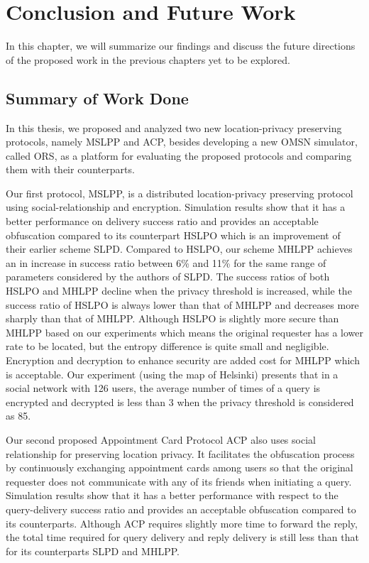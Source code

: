 


\chapter{ Conclusion and Future Work}
\label{CFW}
 

\noindent In this chapter, we will summarize our findings and discuss the future directions of the proposed work in the previous chapters yet to be explored. 


\section{ Summary of Work Done}

\noindent In this thesis, we proposed and analyzed two new location-privacy preserving protocols, namely MSLPP and ACP, besides developing a new OMSN simulator, called ORS, as a platform for evaluating the proposed protocols and comparing them with their counterparts.

Our first protocol, MSLPP, is a distributed location-privacy preserving protocol using social-relationship and encryption. Simulation results show that it has a better performance on delivery success ratio and provides an acceptable obfuscation compared to its counterpart HSLPO which is an improvement of their earlier scheme SLPD. Compared to HSLPO, our scheme MHLPP achieves an in increase in success ratio between 6\% and 11\% for the same range of parameters considered by the authors of SLPD. The success ratios of both HSLPO and MHLPP decline when the privacy threshold is increased, while the success ratio of HSLPO is always lower than that of MHLPP and decreases more sharply than that of MHLPP. Although HSLPO is slightly more secure than MHLPP based on our experiments which means the original requester has a lower rate to be located, but the entropy difference is quite small and negligible. Encryption and decryption to enhance security are added cost for MHLPP which is acceptable. Our experiment (using the map of Helsinki) presents that in a social network with 126 users, the average number of times of a query is encrypted and decrypted is less than 3 when the privacy threshold is considered as 85.

Our second proposed Appointment Card Protocol ACP also uses social relationship for preserving location privacy. It facilitates the obfuscation process by continuously exchanging appointment cards among users so that the original requester does not communicate with any of its friends when initiating a query. Simulation results show that it has a better performance with respect to the query-delivery success ratio and provides an acceptable obfuscation compared to its counterparts. Although ACP requires slightly more time to forward the reply, the total time required for query delivery and reply delivery is still less than that for its counterparts SLPD and MHLPP.

